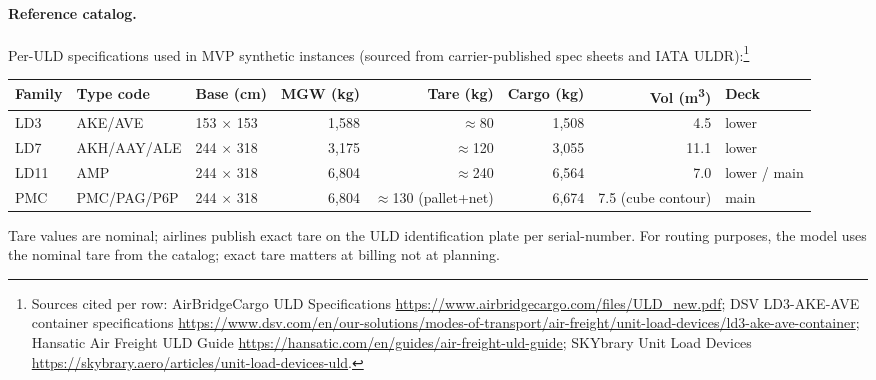 \documentclass[11pt,a4paper]{article}
\theoremstyle{definition}
\begin{document}
\paragraph{Reference catalog.}
Per-ULD specifications used in MVP synthetic instances (sourced from carrier-published
spec sheets and IATA ULDR):\footnote{Sources cited per row: AirBridgeCargo ULD
Specifications \url{https://www.airbridgecargo.com/files/ULD_new.pdf};
DSV LD3-AKE-AVE container specifications
\url{https://www.dsv.com/en/our-solutions/modes-of-transport/air-freight/unit-load-devices/ld3-ake-ave-container};
Hansatic Air Freight ULD Guide \url{https://hansatic.com/en/guides/air-freight-uld-guide};
SKYbrary Unit Load Devices \url{https://skybrary.aero/articles/unit-load-devices-uld}.}

\begin{center}
\small
\begin{tabular}{lllrrrrl}
\toprule
Family & Type code & Base (cm) & MGW (kg) & Tare (kg) & Cargo (kg) & Vol (m\textsuperscript{3}) & Deck \\
\midrule
LD3 & AKE/AVE & 153 $\times$ 153 & 1{,}588 & $\approx$80 & 1{,}508 & 4.5 & lower \\
LD7 & AKH/AAY/ALE & 244 $\times$ 318 & 3{,}175 & $\approx$120 & 3{,}055 & 11.1 & lower \\
LD11 & AMP & 244 $\times$ 318 & 6{,}804 & $\approx$240 & 6{,}564 & 7.0 & lower / main \\
PMC & PMC/PAG/P6P & 244 $\times$ 318 & 6{,}804 & $\approx$130 (pallet+net) & 6{,}674 & 7.5 (cube contour) & main \\
\bottomrule
\end{tabular}
\end{center}

Tare values are nominal; airlines publish exact tare on the ULD identification plate per
serial-number. For routing purposes, the model uses the nominal tare from the catalog;
exact tare matters at billing not at planning.
\end{document}

